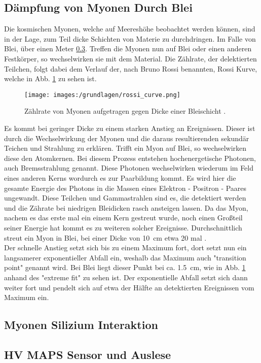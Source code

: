 \subsection{Dämpfung von Myonen Durch Blei}
Die kosmischen Myonen, welche auf Meereshöhe beobachtet werden können, sind in der Lage, zum Teil dicke Schichten von Materie zu durchdringen. 
Im Falle von Blei, über einen Meter \ref{}. 
Treffen die Myonen nun auf Blei oder einen anderen Festkörper, so wechselwirken sie mit dem Material.  
Die Zählrate, der delektierten Teilchen, folgt dabei dem Verlauf der, nach Bruno Rossi benannten, Rossi Kurve, welche in Abb. \ref{fig:rossi_curve} zu sehen ist. 

\begin{figure}[H]
    \centering
    \texttt{[image: images:/grundlagen/rossi\_curve.png]}
    \caption{ Zählrate von Myonen aufgetragen gegen Dicke einer Bleischicht   \cite{Altameemi2019}.}
    \label{fig:rossi_curve}
\end{figure}

Es kommt bei geringer Dicke zu einem starken Anstieg an Ereignissen. 
Dieser ist durch die Wechselwirkung der Myonen und die daraus resultierenden sekundär Teichen und Strahlung zu erklären.
\newpage
Trifft ein Myon auf Blei, so wechselwirken diese den Atomkernen. 
Bei diesem Prozess entstehen hochenergetische Photonen, auch Bremsstrahlung genannt. 
Diese Photonen wechselwirken wiederum im Feld eines anderen Kerns wordurch es zur Paarbildung kommt. 
Es wird hier die gesamte Energie des Photons in die Massen eines Elektron - Positron - Paares ungewandt. 
Diese Teilchen und Gammastrahlen sind es, die detektiert werden und die Zährate bei niedrigen Bleidicken rasch ansteigen lassen. 
Da das Myon, nachem es das erste mal ein einem Kern gestreut wurde, noch einen Großteil seiner Energie hat kommt es zu weiteren solcher Ereignisse. 
Durchschnittlich streut ein Myon in Blei, bei einer Dicke von \SI{10}{cm} etwa 20 mal \cite{Altameemi2019}.\\
\newline
Der schnelle Anstieg setzt sich bis zu einem Maximum fort, dort setzt nun ein langsamerer exponentieller Abfall ein, weshalb das Maximum auch "transition point" genannt wird. 
Bei Blei liegt dieser Punkt bei ca. \SI{1,5}{cm}, wie in Abb. \ref{fig:rossi_curve} anhand des "extreme fit" zu sehen ist. 
Der exponentielle Abfall setzt sich dann weiter fort und pendelt sich auf etwa der Hälfte an detektierten Ereignissen vom Maximum ein. 





\subsection{Myonen Silizium Interaktion}



\subsection{HV MAPS Sensor und Auslese}